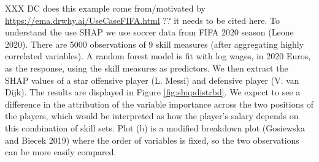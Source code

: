 \documentclass[
]{article}
\begin{document}
XXX DC does this example come from/motivated by
\url{https://ema.drwhy.ai/UseCaseFIFA.html} ?? it needs to be cited
here. To understand the use SHAP we use soccer data from FIFA 2020
season (Leone 2020). There are 5000 observations of 9 skill measures
(after aggregating highly correlated variables). A random forest model
is fit with log wages, in 2020 Euros, as the response, using the skill
measures as predictors. We then extract the SHAP values of a star
offensive player (L. Messi) and defensive player (V. van Dijk). The
results are displayed in Figure \ref{fig:shapdistrbd}. We expect to see
a difference in the attribution of the variable importance across the
two positions of the players, which would be interpreted as how the
player's salary depends on this combination of skill sets. Plot (b) is a
modified breakdown plot (Gosiewska and Biecek 2019) where the order of
variables is fixed, so the two observations can be more easily compared.
\end{document}
